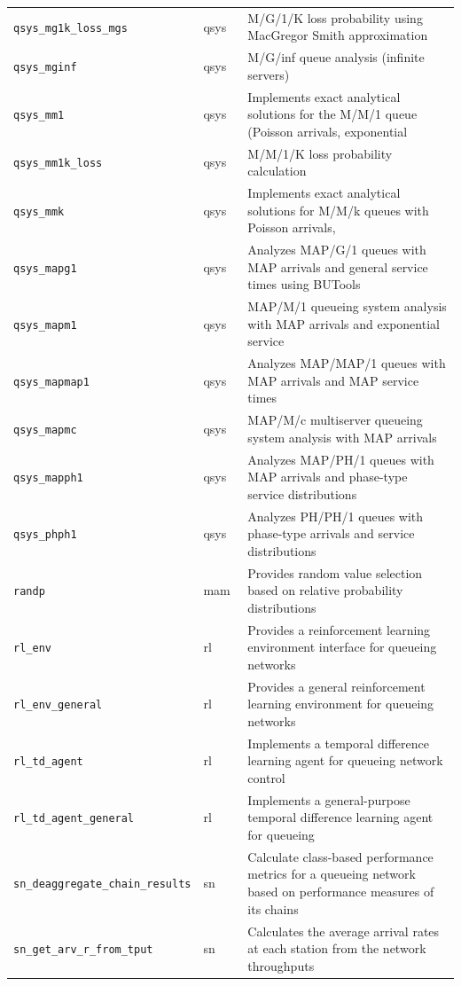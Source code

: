 \begin{footnotesize}
\begin{longtable}{|p{0.4\linewidth}|p{0.1\linewidth}|p{0.5\linewidth}|}
\texttt{qsys\_mg1k\_loss\_mgs} & qsys & M/G/1/K loss probability using MacGregor Smith approximation\\
\texttt{qsys\_mginf} & qsys & M/G/inf queue analysis (infinite servers)\\
\texttt{qsys\_mm1} & qsys & Implements exact analytical solutions for the M/M/1 queue (Poisson arrivals, exponential\\
\texttt{qsys\_mm1k\_loss} & qsys & M/M/1/K loss probability calculation\\
\texttt{qsys\_mmk} & qsys & Implements exact analytical solutions for M/M/k queues with Poisson arrivals,\\
\texttt{qsys\_mapg1} & qsys & Analyzes MAP/G/1 queues with MAP arrivals and general service times using BUTools\\
\texttt{qsys\_mapm1} & qsys & MAP/M/1 queueing system analysis with MAP arrivals and exponential service\\
\texttt{qsys\_mapmap1} & qsys & Analyzes MAP/MAP/1 queues with MAP arrivals and MAP service times\\
\texttt{qsys\_mapmc} & qsys & MAP/M/c multiserver queueing system analysis with MAP arrivals\\
\texttt{qsys\_mapph1} & qsys & Analyzes MAP/PH/1 queues with MAP arrivals and phase-type service distributions\\
\texttt{qsys\_phph1} & qsys & Analyzes PH/PH/1 queues with phase-type arrivals and service distributions\\
\texttt{randp} & mam & Provides random value selection based on relative probability distributions\\
\texttt{rl\_env} & rl & Provides a reinforcement learning environment interface for queueing networks\\
\texttt{rl\_env\_general} & rl & Provides a general reinforcement learning environment for queueing networks\\
\texttt{rl\_td\_agent} & rl & Implements a temporal difference learning agent for queueing network control\\
\texttt{rl\_td\_agent\_general} & rl & Implements a general-purpose temporal difference learning agent for queueing\\
\texttt{sn\_deaggregate\_chain\_results} & sn & Calculate class-based performance metrics for a queueing network based on performance measures of its chains\\
\texttt{sn\_get\_arv\_r\_from\_tput} & sn & Calculates the average arrival rates at each station from the network throughputs\\

\end{longtable}
\end{footnotesize}
